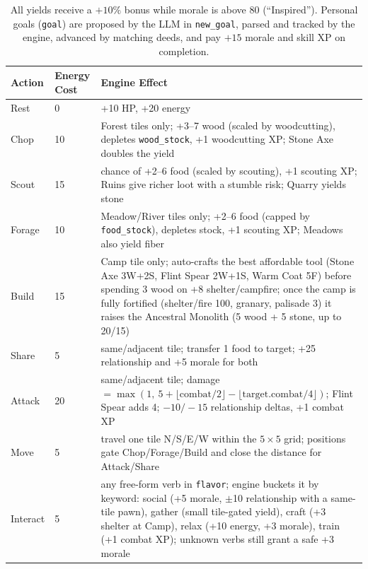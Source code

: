 \documentclass[10pt,a4paper]{article}
\begin{document}
\begin{table}[htbp]
\centering
\caption{Deterministic Action Rules (engine.py)}
\label{tab:actions}
\small
\begin{tabular}{@{}llp{}@{}}
\toprule
\textbf{Action} & \textbf{Energy Cost} & \textbf{Engine Effect} \\
\midrule
Rest   & 0  & +10 HP, +20 energy \\
Chop   & 10 & Forest tiles only; +3--7 wood (scaled by woodcutting), depletes \texttt{wood\_stock}, +1 woodcutting XP; Stone Axe doubles the yield \\
Scout  & 15 & chance of +2--6 food (scaled by scouting), +1 scouting XP; Ruins give richer loot with a stumble risk; Quarry yields stone \\
Forage & 10 & Meadow/River tiles only; +2--6 food (capped by \texttt{food\_stock}), depletes stock, +1 scouting XP; Meadows also yield fiber \\
Build  & 15 & Camp tile only; auto-crafts the best affordable tool (Stone Axe 3W+2S, Flint Spear 2W+1S, Warm Coat 5F) before spending 3 wood on +8 shelter/campfire; once the camp is fully fortified (shelter/fire 100, granary, palisade 3) it raises the Ancestral Monolith (5 wood + 5 stone, up to 20/15) \\
Share  & 5  & same/adjacent tile; transfer 1 food to target; +25 relationship and +5 morale for both \\
Attack & 20 & same/adjacent tile; damage $= \max(1,\ 5 + \lfloor \text{combat}/2 \rfloor - \lfloor \text{target.combat}/4 \rfloor)$; Flint Spear adds 4; $-10/-15$ relationship deltas, +1 combat XP \\
Move   & 5  & travel one tile N/S/E/W within the $5\times5$ grid; positions gate Chop/Forage/Build and close the distance for Attack/Share \\
Interact & 5 & any free-form verb in \texttt{flavor}; engine buckets it by keyword: social (+5 morale, $\pm$10 relationship with a same-tile pawn), gather (small tile-gated yield), craft (+3 shelter at Camp), relax (+10 energy, +3 morale), train (+1 combat XP); unknown verbs still grant a safe +3 morale \\
\bottomrule
\end{tabular}
\caption*{\scriptsize All yields receive a $+10\%$ bonus while morale is above 80 (``Inspired''). Personal goals (\texttt{goal}) are proposed by the LLM in \texttt{new\_goal}, parsed and tracked by the engine, advanced by matching deeds, and pay $+15$ morale and skill XP on completion.}
\end{table}
\end{document}
